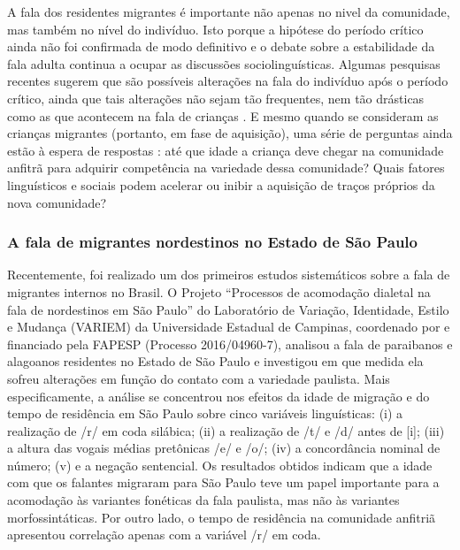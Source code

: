 \documentclass[12pt,a4paper,oneside]{article}
\begin{document}
    A fala dos residentes migrantes é importante não apenas no nivel da comunidade, mas
    também no nível do indivíduo. Isto porque a hipótese do período crítico
    \citep{Lenneberg1967} ainda não foi confirmada de modo definitivo e o debate sobre a
    estabilidade da fala adulta continua a ocupar as discussões sociolinguísticas. Algumas
    pesquisas recentes sugerem que são possíveis alterações na fala do indivíduo após o
    período crítico, ainda que tais alterações não sejam tão frequentes, nem tão drásticas
    como as que acontecem na fala de crianças \citep{Cukor-Avila.Bailey2013}. E mesmo quando
    se consideram as crianças migrantes (portanto, em fase de aquisição), uma série de
    perguntas ainda estão à espera de respostas \citep{Oushiro2016, Nycz2015, Chambers1992,
    Trudgill1986}: até que idade a criança deve chegar na comunidade anfitrã para adquirir
    competência na variedade dessa comunidade?  Quais fatores linguísticos e sociais podem
    acelerar ou inibir a aquisição de traços próprios da nova comunidade?

	    \subsubsection{A fala de migrantes nordestinos no Estado de São Paulo}

		Recentemente, foi realizado um dos primeiros estudos sistemáticos sobre a fala de
		migrantes internos no Brasil. O Projeto \enquote{Processos de acomodação dialetal na
		fala de nordestinos em São Paulo} do Laboratório de Variação, Identidade, Estilo e
		Mudança (VARIEM) da Universidade Estadual de Campinas, coordenado por
		\citet{Oushiro2018} e financiado pela FAPESP (Processo 2016/04960-7), analisou a
		fala de paraibanos e alagoanos residentes no Estado de São Paulo e investigou em que
		medida ela sofreu alterações em função do contato com a variedade paulista. Mais
		especificamente, a análise se concentrou nos efeitos da idade de migração e do tempo
		de residência em São Paulo sobre cinco variáveis linguísticas: (i) a realização de
		/r/ em coda silábica; (ii) a realização de /t/ e /d/ antes de [i]; (iii) a altura
		das vogais médias pretônicas /e/ e /o/; (iv) a concordância nominal de número; (v) e
		a negação sentencial. Os resultados obtidos indicam que a idade com que os falantes
		migraram para São Paulo teve um papel importante para a acomodação às variantes
		fonéticas da fala paulista, mas não às variantes morfossintáticas. Por outro lado, o
		tempo de residência na comunidade anfitriã apresentou correlação apenas com a
		variável /r/ em coda.
\end{document}
